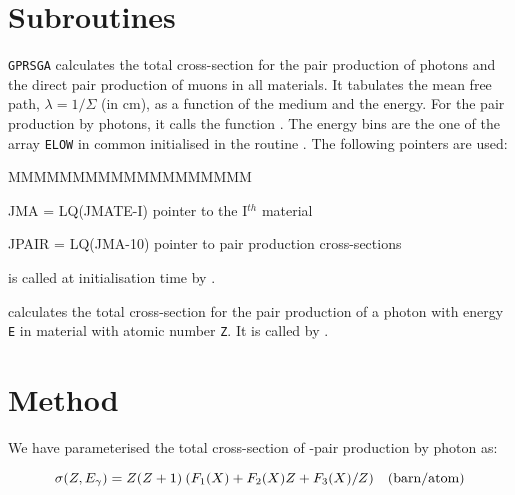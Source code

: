  
\section{Subroutines} 
{\tt GPRSGA} calculates the total cross-section for
the pair production of photons and the direct pair production of muons
in all materials. It tabulates the mean free path, $\lambda =
1/\Sigma$ (in cm), as a function of the medium and the energy.
For the pair production by photons, it calls the function 
. The energy
bins are the one of the array {\tt ELOW} in common 
initialised in the
routine . The following pointers are used:
\begin{DLtt}{MMMMMMMMMMMMMMMMMMM}
\item[JMA = LQ(JMATE-I)]  pointer to the I$^{th}$ material
\item[JPAIR = LQ(JMA-10)] pointer to pair production cross-sections
\end{DLtt}
 is called at initialisation time by .

 calculates the total cross-section for
the pair production of a photon with energy {\tt E} in material
with atomic number {\tt Z}. It is called by .

\section{Method}
 
We have parameterised the total cross-section of \Pep\Pem-pair
production by photon as:
 
\begin{equation}
\sigma(Z,E_\gamma) = Z(Z+1) \:(F_1(X) + F_2(X) Z +
F_3(X)/Z)  \mbox{\quad (barn/atom)}
\label{eq:phys210-1}
\end{equation}

